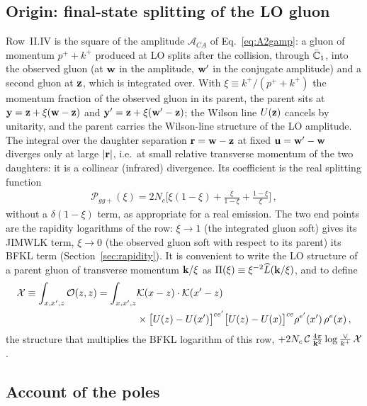 \subsection{Origin: final-state splitting of the LO gluon}\label{sec:dg_origin}

Row~II.IV is the square of the amplitude $\mathcal A_{CA}$ of Eq.~\eqref{eq:A2gamp}: a gluon of momentum $p^++k^+$ produced at LO splits after the collision, through $\bar{\mathbb{C}}_1$, into the observed gluon (at $\mathbf{w}$ in the amplitude, $\mathbf{w}'$ in the conjugate amplitude) and a second gluon at $\mathbf{z}$, which is integrated over. With $\xi\equiv k^+/(p^++k^+)$ the momentum fraction of the observed gluon in its parent, the parent sits at $\mathbf{y}=\mathbf{z}+\xi(\mathbf{w}-\mathbf{z})$ and $\mathbf{y}'=\mathbf{z}+\xi(\mathbf{w}'-\mathbf{z})$; the Wilson line $U(\mathbf{z})$ cancels by unitarity, and the parent carries the Wilson-line structure of the LO amplitude. The integral over the daughter separation $\mathbf{r}=\mathbf{w}-\mathbf{z}$ at fixed $\mathbf{u}=\mathbf{w}'-\mathbf{w}$ diverges only at large $|\mathbf{r}|$, i.e.\ at small relative transverse momentum of the two daughters: it is a collinear (infrared) divergence. Its coefficient is the real splitting function
\begin{align}\label{eq:Pggplus}
\mathcal P_{gg+}(\xi)=2N_c\Big[\xi(1-\xi)+\frac{\xi}{1-\xi}+\frac{1-\xi}{\xi}\Big]\,,
\end{align}
without a $\delta(1-\xi)$ term, as appropriate for a real emission. The two end points are the rapidity logarithms of the row: $\xi\to1$ (the integrated gluon soft) gives its JIMWLK term, $\xi\to0$ (the observed gluon soft with respect to its parent) its BFKL term (Section~\ref{sec:rapidity}). It is convenient to write the LO structure of a parent gluon of transverse momentum $\mathbf{k}/\xi$ as $\Pi(\xi)\equiv\xi^{-2}\widehat L(\mathbf{k}/\xi)$, and to define
\begin{align}\label{eq:dg_X}
\mathcal X\equiv\int_{x,x',z}\mathcal O(z,z)=\int_{x,x',z}&\mathcal{K}(x-z)\cdot\mathcal{K}(x'-z)\notag\\&\times\big[U(z)-U(x')\big]^{ce'}\big[U(z)-U(x)\big]^{ce}\rho^{e'}(x')\,\rho^e(x)\,,
\end{align}
the structure that multiplies the BFKL logarithm of this row, $+2N_c\,\mathcal C\,\frac{4\pi}{\mathbf{k}^2}\log\frac{\vee}{k^+}\,\mathcal X$.

\subsection{Account of the poles}\label{sec:dg_poles}

